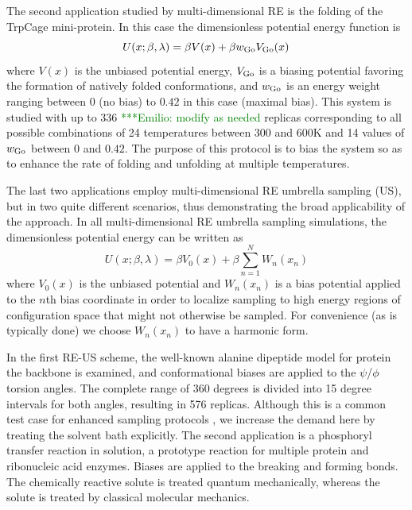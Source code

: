 \documentclass{sig-alternate}
\newcommand{\egnote}[1]{ {\textcolor{green} { ***Emilio: #1 }}}
\begin{document}
The second application studied by multi-dimensional RE is the folding of the TrpCage mini-protein. In this case the dimensionless potential energy function is
\begin{equation}
U(x;\beta,\lambda) = \beta V(x) + \beta w_{\rm Go} V_{\rm Go}(x) \,
\end{equation}
where $V(x)$ is the unbiased potential energy, $V_{\rm Go}$ is a biasing potential favoring the formation of natively folded conformations, and $w_{\rm Go}$ is an energy weight ranging between 0 (no bias) to $0.42$ in this case (maximal bias). This system is studied with up to 336 \egnote{modify as needed} replicas corresponding to all possible combinations of 24 temperatures between 300 and 600K and 14 values of  $w_{\rm Go}$ between 0 and $0.42$. The purpose of this protocol is to bias the system so as to enhance the rate of folding and unfolding at multiple temperatures.

The last two applications employ multi-dimensional RE umbrella sampling (US), but in two
quite different scenarios, thus demonstrating the broad applicability of the approach.
In all multi-dimensional RE umbrella sampling simulations, the dimensionless potential
energy can be written as
\begin{equation}
U(x;\beta,\lambda) = \beta V_0(x) + \beta \sum_{n=1}^N W_n(x_n)
\end{equation}
where $V_0(x)$ is the unbiased potential and $W_n(x_n)$ is a bias potential applied to
the $n$th bias coordinate in order to localize sampling to high energy regions of
configuration space that might not otherwise be sampled. For convenience (as is
typically done) we choose $W_n(x_n)$ to have a harmonic form.  

In the first RE-US scheme, the well-known alanine dipeptide model for protein the
backbone is examined, and conformational biases are applied to the $\psi$/$\phi$ torsion
angles. The complete range of 360 degrees is divided into 15 degree intervals for both
angles, resulting in 576 replicas. Although this is a common test case for enhanced
sampling protocols
, we increase the demand here by treating the solvent bath explicitly. The second
application is a phosphoryl transfer reaction in solution, a prototype reaction for
multiple protein and ribonucleic acid enzymes. Biases are applied to the breaking and
forming bonds. The chemically reactive solute is treated quantum mechanically, whereas
the solute is treated by classical molecular mechanics. 
\end{document}
